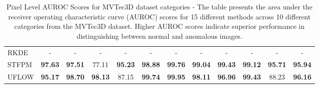 \begin{table}[h!]
{\begin{tabular}{l*{11}{c}}
        RKDE & - & - & - & - & - & - & - & - & - & - & - \\
        STFPM & \textbf{97.63} & \textbf{97.51} & 77.11 & \textbf{95.23} & \textbf{98.88} & \textbf{99.76} & \textbf{99.04} & \textbf{99.43} & \textbf{99.12} & \textbf{95.71} & \textbf{95.94} \\
        UFLOW & \textbf{95.17} & \textbf{98.70} & \textbf{98.13} & 87.15 & \textbf{99.74} & \textbf{99.95} & \textbf{98.11} & \textbf{96.96} & \textbf{99.43} & 88.23 & \textbf{96.16} \\
        \bottomrule
        \end{tabular}
    }
    \caption{Pixel Level AUROC Scores for MVTec3D\cite{Bergmann_2022_mvtec3d} dataset categories - The table presents the area under the receiver operating characteristic curve (AUROC) scores for 15 different methods across 10 different categories from the MVTec3D dataset. Higher AUROC scores indicate superior performance in distinguishing between normal and anomalous images.}
    \label{table:MVTec3D Pixel AUROC}
\end{table}